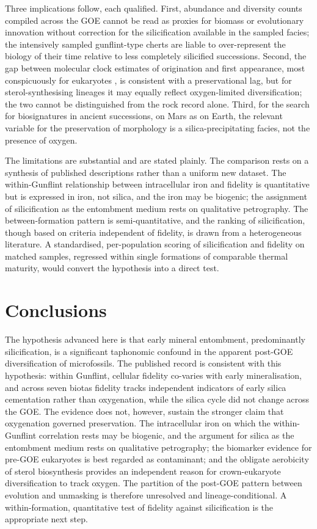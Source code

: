 \documentclass[11pt]{article}
\begin{document}
Three implications follow, each qualified. First, abundance and diversity counts compiled across the
GOE cannot be read as proxies for biomass or evolutionary innovation without correction for the
silicification available in the sampled facies; the intensively sampled gunflint-type cherts are
liable to over-represent the biology of their time relative to less completely silicified successions.
Second, the gap between molecular clock estimates of origination and first appearance, most
conspicuously for eukaryotes \citep{Betts2018}, is consistent with a preservational lag, but for
sterol-synthesising lineages it may equally reflect oxygen-limited diversification; the two cannot be
distinguished from the rock record alone. Third, for the search for biosignatures in ancient
successions, on Mars as on Earth, the relevant variable for the preservation of morphology is a
silica-precipitating facies, not the presence of oxygen.

The limitations are substantial and are stated plainly. The comparison rests on a synthesis of
published descriptions rather than a uniform new dataset. The within-Gunflint relationship between
intracellular iron and fidelity is quantitative but is expressed in iron, not silica, and the iron may
be biogenic; the assignment of silicification as the entombment medium rests on qualitative
petrography. The between-formation pattern is semi-quantitative, and the ranking of silicification,
though based on criteria independent of fidelity, is drawn from a heterogeneous literature. A
standardised, per-population scoring of silicification and fidelity on matched samples, regressed
within single formations of comparable thermal maturity, would convert the hypothesis into a direct
test.

\section{Conclusions}

The hypothesis advanced here is that early mineral entombment, predominantly silicification, is a
significant taphonomic confound in the apparent post-GOE diversification of microfossils. The
published record is consistent with this hypothesis: within Gunflint, cellular fidelity co-varies
with early mineralisation, and across seven biotas fidelity tracks independent indicators of early
silica cementation rather than oxygenation, while the silica cycle did not change across the GOE.
The evidence does not, however, sustain the stronger claim that oxygenation governed preservation.
The intracellular iron on which the within-Gunflint correlation rests may be biogenic, and the
argument for silica as the entombment medium rests on qualitative petrography; the biomarker
evidence for pre-GOE eukaryotes is best regarded as contaminant; and the obligate aerobicity of
sterol biosynthesis provides an independent reason for crown-eukaryote diversification to track
oxygen. The partition of the post-GOE pattern between evolution and unmasking is therefore
unresolved and lineage-conditional. A within-formation, quantitative test of fidelity against
silicification is the appropriate next step.
\end{document}
